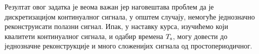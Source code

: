 Резултат овог задатка је веома важан јер наговештава проблем да је дискретизацијом 
континуалног сигнала, у општем случају, 
немогуће једнозначно реконструисати полазни сигнал. Ипак, у наставку курса, изучићемо који квалитети 
континуалног сигнала, и одабир времена $T_{\rm s}$, могу довести до једнозначне реконструкције
и много сложенијих сигнала од простопериодичног.  